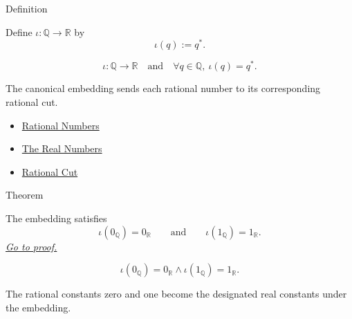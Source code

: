 \begin{definitionbox}{Definition}
\begin{definition}
\label{def:real-chapter-embedding-q-into-r}
Define $\iota:\mathbb{Q}\to\mathbb{R}$ by
\[
\iota(q):=q^{\ast}.
\]
\end{definition}
\end{definitionbox}

\begin{remark*}
\[
\iota:\mathbb{Q}\to\mathbb{R}
\quad\text{and}\quad
\forall q\in\mathbb{Q},\ \iota(q)=q^{\ast}.
\]
\end{remark*}

\begin{remark*}[Interpretation]
The canonical embedding sends each rational number to its corresponding rational cut.
\end{remark*}

\begin{dependencies}
\begin{itemize}
  \item \hyperref[def:rationals]{Rational Numbers}
  \item \hyperref[def:reals]{The Real Numbers}
  \item \hyperref[def:rational-cut]{Rational Cut}
\end{itemize}
\end{dependencies}

\begin{theorembox}{Theorem}
\begin{theorem}
\label{thm:embedding-q-into-r-preserves-zero-one}
The embedding satisfies
\[
\iota(0_{\mathbb{Q}})=0_{\mathbb{R}}
\qquad\text{and}\qquad
\iota(1_{\mathbb{Q}})=1_{\mathbb{R}}.
\]
\hyperref[prf:embedding-q-into-r-preserves-zero-one]{\textit{Go to proof.}}
\end{theorem}
\end{theorembox}

\begin{remark*}
\[
\iota(0_{\mathbb{Q}})=0_{\mathbb{R}}
\land
\iota(1_{\mathbb{Q}})=1_{\mathbb{R}}.
\]
\end{remark*}

\begin{remark*}[Interpretation]
The rational constants zero and one become the designated real constants under the embedding.
\end{remark*}


